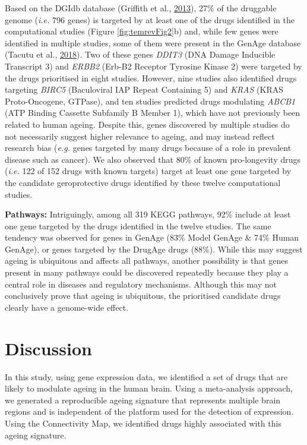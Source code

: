 \documentclass[12pt,twoside]{unicam}
\begin{document}
Based on the DGIdb database (Griffith et al., \protect\hyperlink{ref-Griffith2013}{2013}), 27\% of the druggable genome (\emph{i.e.} 796 genes) is targeted by at least one of the drugs identified in the computational studies (Figure \ref{fig:temrevFig2}b) and, while few genes were identified in multiple studies, some of them were present in the GenAge database (Tacutu et al., \protect\hyperlink{ref-Tacutu2018}{2018}). Two of these genes \emph{DDIT3} (DNA Damage Inducible Transcript 3) and \emph{ERBB2} (Erb-B2 Receptor Tyrosine Kinase 2) were targeted by the drugs prioritised in eight studies. However, nine studies also identified drugs targeting \emph{BIRC5} (Baculoviral IAP Repeat Containing 5) and \emph{KRAS} (KRAS Proto-Oncogene, GTPase), and ten studies predicted drugs modulating \emph{ABCB1} (ATP Binding Cassette Subfamily B Member 1), which have not previously been related to human ageing. Despite this, genes discovered by multiple studies do not necessarily suggest higher relevance to ageing, and may instead reflect research bias (\emph{e.g.} genes targeted by many drugs because of a role in prevalent disease such as cancer). We also observed that 80\% of known pro-longevity drugs (\emph{i.e.} 122 of 152 drugs with known targets) target at least one gene targeted by the candidate geroprotective drugs identified by these twelve computational studies.

\textbf{Pathways:} Intriguingly, among all 319 KEGG pathways, 92\% include at least one gene targeted by the drugs identified in the twelve studies. The same tendency was observed for genes in GenAge (83\% Model GenAge \& 74\% Human GenAge), or genes targeted by the DrugAge drugs (88\%). While this may suggest ageing is ubiquitous and affects all pathways, another possibility is that genes present in many pathways could be discovered repeatedly because they play a central role in diseases and regulatory mechanisms. Although this may not conclusively prove that ageing is ubiquitous, the prioritised candidate drugs clearly have a genome-wide effect.

\hypertarget{discussion-2}{%
\section{Discussion}\label{discussion-2}}

In this study, using gene expression data, we identified a set of drugs that are likely to modulate ageing in the human brain. Using a meta-analysis approach, we generated a reproducible ageing signature that represents multiple brain regions and is independent of the platform used for the detection of expression. Using the Connectivity Map, we identified drugs highly associated with this ageing signature.
\end{document}
